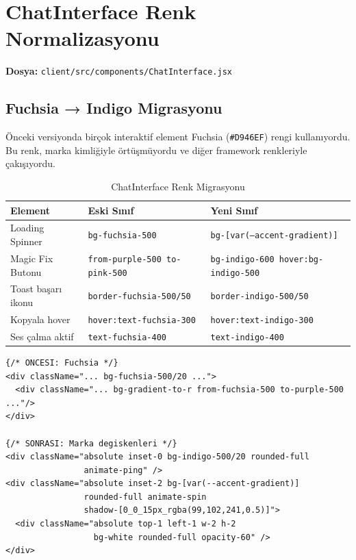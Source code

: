\documentclass[12pt,a4paper]{article}
\begin{document}
\section{ChatInterface Renk Normalizasyonu}

\textbf{Dosya:} \texttt{client/src/components/ChatInterface.jsx}

\subsection{Fuchsia → Indigo Migrasyonu}

Önceki versiyonda birçok interaktif element Fuchsia (\texttt{\#D946EF}) rengi kullanıyordu. Bu renk, marka kimliğiyle örtüşmüyordu ve diğer framework renkleriyle çakışıyordu.

\begin{table}[h!]
\centering
\begin{tabular}{lll}
\toprule
\textbf{Element} & \textbf{Eski Sınıf} & \textbf{Yeni Sınıf} \\
\midrule
Loading Spinner & \texttt{bg-fuchsia-500} & \texttt{bg-[var(--accent-gradient)]} \\
Magic Fix Butonu & \texttt{from-purple-500 to-pink-500} & \texttt{bg-indigo-600 hover:bg-indigo-500} \\
Toast başarı ikonu & \texttt{border-fuchsia-500/50} & \texttt{border-indigo-500/50} \\
Kopyala hover & \texttt{hover:text-fuchsia-300} & \texttt{hover:text-indigo-300} \\
Ses çalma aktif & \texttt{text-fuchsia-400} & \texttt{text-indigo-400} \\
\bottomrule
\end{tabular}
\caption{ChatInterface Renk Migrasyonu}
\end{table}

\begin{lstlisting}[language=JSX, caption={Loading Spinner - Oncesi ve Sonrasi - ChatInterface.jsx:1601}]
{/* ONCESI: Fuchsia */}
<div className="... bg-fuchsia-500/20 ...">
  <div className="... bg-gradient-to-r from-fuchsia-500 to-purple-500 ..."/>
</div>

{/* SONRASI: Marka degiskenleri */}
<div className="absolute inset-0 bg-indigo-500/20 rounded-full
                animate-ping" />
<div className="absolute inset-2 bg-[var(--accent-gradient)]
                rounded-full animate-spin
                shadow-[0_0_15px_rgba(99,102,241,0.5)]">
  <div className="absolute top-1 left-1 w-2 h-2
                  bg-white rounded-full opacity-60" />
</div>
\end{lstlisting}
\end{document}
